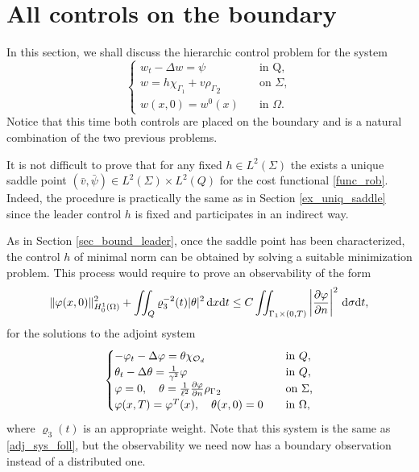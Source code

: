 \documentclass{dcds-bOF}
\theoremstyle{definition}
\def\cbd{\Gamma}
\def\csbd{\rho_{\Gamma}}
\def\dx{\,\textnormal{d}x}
\def\dt{\textnormal{d}t}
\def\d{\,\textnormal{d}}
\begin{document}
\section{All controls on the boundary}\label{sec_bound}

In this section, we shall discuss the hierarchic control problem for the system
%
\begin{equation}\label{sys_sec3}
\begin{cases}
w_t-\Delta w=\psi & \quad \text{in Q}, \\
w=h\chi_{\cbd_1}+ v{\csbd}_2&\quad \text{on } \Sigma, \\
w(x,0)=w^0(x) &\quad \text{in } \Omega.
\end{cases}
\end{equation}
%
Notice that this time both controls are placed on the boundary and is a natural combination of the two previous problems. %

It is not difficult to prove that for any fixed $h\in L^2(\Sigma)$ the exists a unique saddle point $(\bar v,\bar \psi)\in L^2(\Sigma)\times L^2(Q)$ for the cost functional \eqref{func_rob}. Indeed, the procedure is practically the same as in Section \ref{ex_uniq_saddle} since the leader control $h$ is fixed and participates in an indirect way.

As in Section \ref{sec_bound_leader}, once the saddle point has been characterized, the control $h$ of minimal norm can be obtained by solving a suitable minimization problem. This process would require to prove an observability of the form
%
\begin{equation}\label{obs_ineq_sec3}
\|\varphi(x,0)\|^2_{H_0^1(\Omega)}+\iint_{Q}\varrho_3^{-2}(t)|\theta|^2\dx\dt\leq C\iint_{ \cbd_1\times(0,T)}\left|\frac{\partial\varphi}{\partial n}\right|^2\d\sigma\dt,
\end{equation}
%
 for the solutions to the adjoint system
%
\begin{equation}\label{adj_sys_3}
\begin{cases}
-\varphi_t-\Delta \varphi= \theta\chi_{\mathcal O_d} \quad&\textnormal{in }Q, \\
\theta_t-\Delta \theta=\frac{1}{\gamma^2}\varphi \quad& \textnormal{in }Q, \\
\varphi=0, \quad \theta=\frac{1}{\ell^2}\frac{\partial \varphi}{\partial n}{\csbd}_2 \quad &\textnormal{on $\Sigma$,} \\
\varphi(x,T)=\varphi^T(x), \quad \theta(x,0)=0 \quad &\textnormal{in $\Omega$},
\end{cases}
\end{equation}
%
where $\varrho_3(t)$ is an appropriate weight. Note that this system is the same as \eqref{adj_sys_foll}, but the observability we need now has a boundary observation instead of a distributed one.
\end{document}
